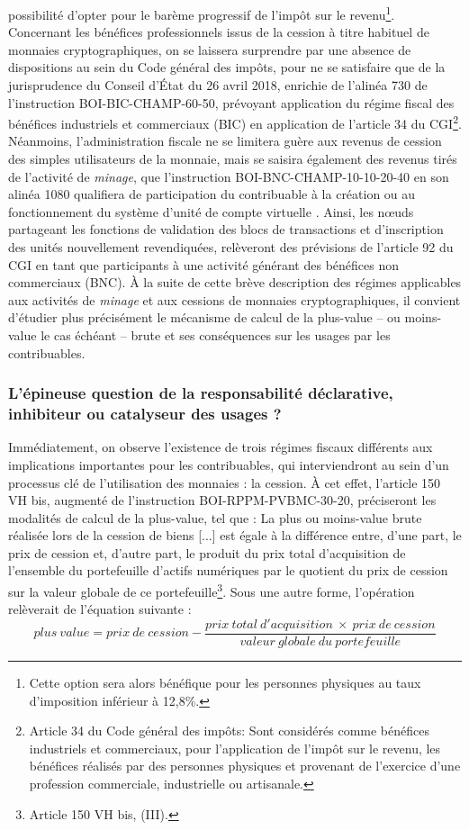 {possibilité d'opter pour le  barème progressif de l'impôt sur le revenu\footnote{Cette option sera alors bénéfique pour les personnes physiques au taux d'imposition inférieur à 12,8\%.}. Concernant les bénéfices professionnels issus de la cession à titre habituel de monnaies cryptographiques, on se laissera surprendre par une absence de dispositions au sein du Code général des impôts, pour ne se satisfaire que de la jurisprudence du Conseil d'État du 26 avril 2018, enrichie de l'alinéa 730 de l'instruction BOI-BIC-CHAMP-60-50, prévoyant application du régime fiscal des bénéfices industriels et commerciaux (\acrshort{BIC}) en application de l'article 34 du CGI\footnote{Article 34 du Code général des impôts: \og Sont considérés comme bénéfices industriels et commerciaux, pour l'application de l'impôt sur le revenu, les bénéfices réalisés par des personnes physiques et provenant de l'exercice d'une profession commerciale, industrielle ou artisanale\fg{}.}. Néanmoins, l'administration fiscale ne se limitera guère aux revenus de cession des simples utilisateurs de la monnaie, mais se saisira également des revenus tirés de l'activité de \emph{minage}, que l'instruction BOI-BNC-CHAMP-10-10-20-40 en son alinéa 1080 qualifiera de \og participation du contribuable à la création ou au fonctionnement du système d'unité de compte virtuelle \fg{}. Ainsi, les n\oe{}uds partageant les fonctions de validation des blocs de transactions et d'inscription des unités nouvellement revendiquées, relèveront des prévisions de l'article 92 du CGI en tant que participants à une activité générant des bénéfices non commerciaux (\acrshort{BNC}). À la suite de cette brève description des régimes applicables aux activités de \emph{minage} et aux cessions de monnaies cryptographiques, il convient d'étudier plus précisément le mécanisme de calcul de la plus-value \---{} ou moins-value le cas échéant \---{} brute et ses conséquences sur les usages par les contribuables.

\subsubsection{L'épineuse question de la responsabilité déclarative, inhibiteur ou catalyseur des usages ?}

Immédiatement, on observe l'existence de trois régimes fiscaux différents aux implications importantes pour les contribuables, qui interviendront au sein d'un processus clé de l'utilisation des monnaies : la cession. À cet effet, l'article 150 VH bis, augmenté de l'instruction BOI-RPPM-PVBMC-30-20, préciseront les modalités de calcul de la plus-value, tel que : \og La plus ou moins-value brute réalisée lors de la cession de biens [...] est égale à la différence entre, d'une part, le prix de cession et, d'autre part, le produit du prix total d'acquisition de l'ensemble du portefeuille d'actifs numériques par le quotient du prix de cession sur la valeur globale de ce portefeuille\fg{}\footnote{Article 150 VH bis, (III).}. Sous une autre forme, l'opération relèverait de l'équation suivante :
\[  plus\ value = prix\ de\ cession - \frac{prix\ total\ d'acquisition\ \times\  prix\ de\ cession}{valeur\ globale\ du\ portefeuille} \]

}
